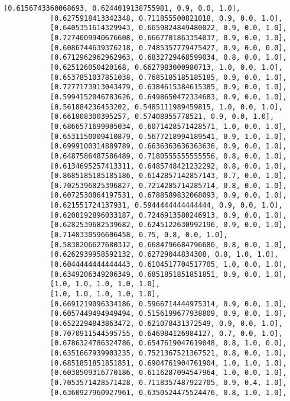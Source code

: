 \documentclass[11pt]{article}
\begin{document}
\begin{Verbatim}[commandchars=\\\{\}]
           [0.6156743360068693, 0.6244019138755981, 0.9, 0.0, 1.0],
           [0.6275918413342348, 0.711855500821018, 0.9, 0.0, 1.0],
           [0.6405351614329943, 0.6659824849480022, 0.9, 0.0, 1.0],
           [0.7274009940676608, 0.6667701863354037, 0.9, 0.0, 1.0],
           [0.6086744639376218, 0.7485357779475427, 0.9, 0.0, 0.0],
           [0.6712962962962963, 0.6832729468599034, 0.8, 0.0, 1.0],
           [0.625126050420168, 0.6627983000980713, 1.0, 0.0, 1.0],
           [0.6537851037851038, 0.7685185185185185, 0.9, 0.0, 1.0],
           [0.7277173913043479, 0.6384615384615385, 0.9, 0.0, 1.0],
           [0.5994152046783626, 0.6498650472334683, 0.9, 0.0, 1.0],
           [0.561884236453202, 0.5485111989459815, 1.0, 0.0, 1.0],
           [0.661808300395257, 0.57408955778521, 0.9, 0.0, 1.0],
           [0.6866571699905034, 0.6071428571428571, 1.0, 0.0, 1.0],
           [0.6531150009410879, 0.5677218994189541, 0.9, 1.0, 1.0],
           [0.6999100314889789, 0.6636363636363636, 0.9, 0.0, 1.0],
           [0.6487586487586489, 0.7180555555555556, 0.8, 0.0, 1.0],
           [0.6134695257413311, 0.6485748421232292, 0.8, 0.0, 1.0],
           [0.8685185185185186, 0.6142857142857143, 0.7, 0.0, 1.0],
           [0.7025396825396827, 0.7214285714285714, 0.8, 0.0, 1.0],
           [0.6072530864197531, 0.6788589832068093, 0.9, 0.0, 1.0],
           [0.621551724137931, 0.5944444444444444, 0.9, 0.0, 1.0],
           [0.6208192896033187, 0.7246913580246913, 0.9, 0.0, 1.0],
           [0.6282539682539682, 0.6245122630992196, 0.9, 0.0, 1.0],
           [0.7148330596606458, 0.75, 0.8, 0.0, 1.0],
           [0.5838206627680312, 0.6684796684796686, 0.8, 0.0, 1.0],
           [0.6262939958592132, 0.62729044834308, 0.8, 1.0, 1.0],
           [0.6044444444444443, 0.6104517704517705, 1.0, 0.0, 1.0],
           [0.6349206349206349, 0.6851851851851851, 0.9, 0.0, 1.0],
           [1.0, 1.0, 1.0, 1.0, 1.0],
           [1.0, 1.0, 1.0, 1.0, 1.0],
           [0.6691219096334186, 0.5966714444975314, 0.9, 0.0, 1.0],
           [0.6057449494949494, 0.5156199677938809, 0.9, 0.0, 1.0],
           [0.6522294843863472, 0.621078431372549, 0.9, 0.0, 1.0],
           [0.7070911544595755, 0.646984126984127, 0.7, 0.0, 1.0],
           [0.6786324786324786, 0.6547619047619048, 0.8, 1.0, 0.0],
           [0.6351667939903235, 0.7521367521367521, 0.8, 0.0, 1.0],
           [0.6851851851851851, 0.6904761904761904, 1.0, 1.0, 1.0],
           [0.6038509316770186, 0.6116287094547964, 1.0, 0.0, 1.0],
           [0.7053571428571428, 0.7118357487922705, 0.9, 0.4, 1.0],
           [0.6360927960927961, 0.6350524475524476, 0.8, 1.0, 1.0],

\end{Verbatim}
\end{document}
